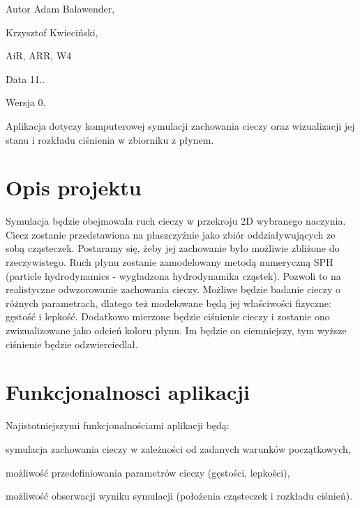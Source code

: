 \begin{DoxyAuthor}{Autor}
Adam Balawender, 

Krzysztof Kwieciński, 

Ai\-R, A\-R\-R, W4 
\end{DoxyAuthor}
\begin{DoxyDate}{Data}
11.. 
\end{DoxyDate}
\begin{DoxyVersion}{Wersja}
0.
\end{DoxyVersion}
Aplikacja dotyczy komputerowej symulacji zachowania cieczy oraz wizualizacji jej stanu i rozkładu ciśnienia w zbiorniku z płynem.\hypertarget{index_etykieta-opis-projektu}{}\section{Opis projektu}\label{index_etykieta-opis-projektu}
Symulacja będzie obejmowała ruch cieczy w przekroju 2\-D wybranego naczynia. Ciecz zostanie przedstawiona na płaszczyźnie jako zbiór oddziaływujących ze sobą cząsteczek. Postaramy się, żeby jej zachowanie było możliwie zbliżone do rzeczywistego. Ruch płynu zostanie zamodelowany metodą numeryczną S\-P\-H (particle hydrodynamics -\/ wygładzona hydrodynamika cząstek). Pozwoli to na realistyczne odwzorowanie zachowania cieczy. Możliwe będzie badanie cieczy o różnych parametrach, dlatego też modelowane będą jej właściwości fizyczne\-: gęstość i lepkość. Dodatkowo mierzone będzie ciśnienie cieczy i zostanie ono zwizualizowane jako odcień koloru płynu. Im będzie on ciemniejszy, tym wyższe ciśnienie będzie odzwierciedlał.\hypertarget{index_etykieta-funkcjonalnosci-aplikacji}{}\section{Funkcjonalnosci aplikacji}\label{index_etykieta-funkcjonalnosci-aplikacji}
Najistotniejszymi funkcjonalnościami aplikacji będą\-:
\begin{DoxyItemize}
\item symulacja zachowania cieczy w zależności od zadanych warunków początkowych,
\item możliwość przedefiniowania parametrów cieczy (gęstości, lepkości),
\item możliwość obserwacji wyniku symulacji (położenia cząsteczek i rozkładu ciśnień). 
\end{DoxyItemize}